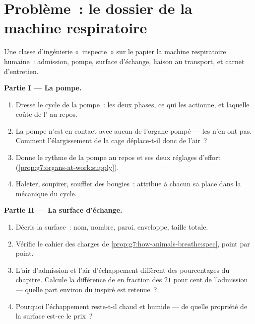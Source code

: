 \section{Problème~: le dossier de la machine respiratoire}

\begin{problem}\label{pb:g7:lungs-and-gas-exchange:1}
Une classe d'ingénierie «~inspecte~» sur le papier la machine
respiratoire humaine~: admission, pompe, surface d'échange, liaison
au transport, et carnet d'entretien.

\medskip\noindent\textbf{Partie I --- La pompe.}
\begin{enumerate}
  \item Dresse le cycle de la pompe~: les deux phases, ce qui les
        actionne, et laquelle coûte de l' au repos.
  \item La pompe n'est en contact avec aucun  de l'organe
        pompé --- les  n'en ont pas. Comment
        l'élargissement de la cage déplace-t-il donc de l'air~?
  \item Donne le rythme de la pompe au repos et ses deux réglages
        d'effort
        (\cref{prop:g7:organs-at-work:supply}).
  \item Haleter, soupirer, souffler des bougies~: attribue à chacun
        sa place dans la mécanique du cycle.
\end{enumerate}

\medskip\noindent\textbf{Partie II --- La surface
d'échange.}
\begin{enumerate}[resume]
  \item Décris la surface~: nom, nombre, paroi, enveloppe, taille
        totale.
  \item Vérifie le cahier des charges de
        \cref{prop:g7:how-animals-breathe:spec}, point par
        point.
  \item L'air d'admission et l'air d'échappement diffèrent des
        pourcentages du chapitre. Calcule la différence de
         en fraction des $21$ pour cent de l'admission ---
        quelle part environ du  inspiré est retenue~?
  \item Pourquoi l'échappement reste-t-il chaud et humide --- de
        quelle propriété de la surface est-ce le prix~?
\end{enumerate}


\end{problem}
